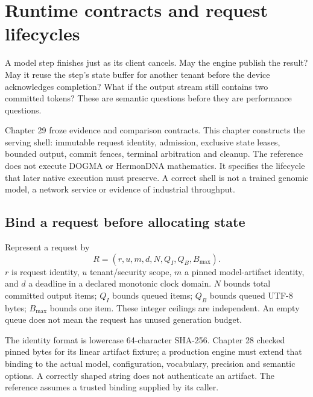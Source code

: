 \chapter{Runtime contracts and request lifecycles}
A model step finishes just as its client cancels. May the engine publish the
result? May it reuse the step's state buffer for another tenant before the
device acknowledges completion? What if the output stream still contains two
committed tokens? These are semantic questions before they are performance questions.

Chapter 29 froze evidence and comparison contracts. This chapter constructs the
serving shell: immutable request identity, admission, exclusive state leases,
bounded output, commit fences, terminal arbitration and cleanup. The reference
does not execute DOGMA or HermonDNA mathematics. It specifies the lifecycle that
later native execution must preserve. A correct shell is not a trained genomic
model, a network service or evidence of industrial throughput.

\section{Bind a request before allocating state}
Represent a request by
\[
 R=(r,u,m,d,N,Q_I,Q_B,B_{\max}).
\]
$r$ is request identity, $u$ tenant/security scope, $m$ a pinned model-artifact
identity, and $d$ a deadline in a declared monotonic clock domain.
$N$ bounds total committed output items; $Q_I$ bounds queued items;
$Q_B$ bounds queued UTF-8 bytes; $B_{\max}$ bounds one item.
These integer ceilings are independent. An empty queue does not mean the request
has unused generation budget.
\par\medskip\noindent\begin{minipage}{\linewidth}
\end{minipage}\par\medskip
The identity format is lowercase 64-character SHA-256. Chapter 28 checked pinned
bytes for its linear artifact fixture; a production engine must extend that
binding to the actual model, configuration, vocabulary, precision and semantic
options. A correctly shaped string does not authenticate an artifact. The reference
assumes a trusted binding supplied by its caller.

